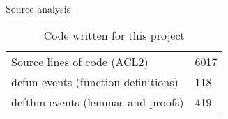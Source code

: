 \documentclass{beamer}
\begin{document}
\begin{frame}{Source analysis}
  \begin{table}[]
    \centering
    \caption{Code written for this project}
    \label{my-label}
    \begin{tabular}{ll}
      Source lines of code (ACL2)      & 6017 \\
      defun events (function definitions) & 118  \\
      defthm events (lemmas and proofs)   & 419 
    \end{tabular}
  \end{table}
\end{frame}
\end{document}
